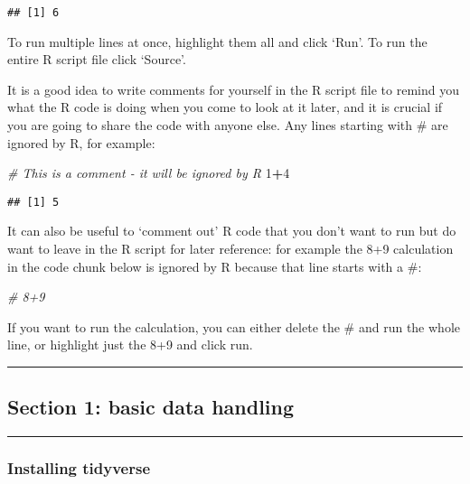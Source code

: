 \documentclass[
]{article}
\newenvironment{Shaded}{\begin{snugshade}}{\end{snugshade}}
\newcommand{\CommentTok}[1]{\textcolor[rgb]{0.56,0.35,0.01}{\textit{#1}}}
\newcommand{\DecValTok}[1]{\textcolor[rgb]{0.00,0.00,0.81}{#1}}
\newcommand{\OperatorTok}[1]{\textcolor[rgb]{0.81,0.36,0.00}{\textbf{#1}}}
\begin{document}
\begin{verbatim}
## [1] 6
\end{verbatim}

To run multiple lines at once, highlight them all and click `Run'. To
run the entire R script file click `Source'.

It is a good idea to write comments for yourself in the R script file to
remind you what the R code is doing when you come to look at it later,
and it is crucial if you are going to share the code with anyone else.
Any lines starting with \# are ignored by R, for example:

\begin{Shaded}
\begin{Highlighting}[]
\CommentTok{# This is a comment - it will be ignored by R}
\DecValTok{1}\OperatorTok{+}\DecValTok{4}
\end{Highlighting}
\end{Shaded}

\begin{verbatim}
## [1] 5
\end{verbatim}

It can also be useful to `comment out' R code that you don't want to run
but do want to leave in the R script for later reference: for example
the 8+9 calculation in the code chunk below is ignored by R because that
line starts with a \#:

\begin{Shaded}
\begin{Highlighting}[]
\CommentTok{# 8+9}
\end{Highlighting}
\end{Shaded}

If you want to run the calculation, you can either delete the \# and run
the whole line, or highlight just the 8+9 and click run.

\begin{center}\rule{0.5\linewidth}{0.5pt}\end{center}

\hypertarget{section-1-basic-data-handling}{%
\subsection{Section 1: basic data
handling}\label{section-1-basic-data-handling}}

\begin{center}\rule{0.5\linewidth}{0.5pt}\end{center}

\hypertarget{installing-tidyverse}{%
\subsubsection{Installing tidyverse}\label{installing-tidyverse}}
\end{document}
